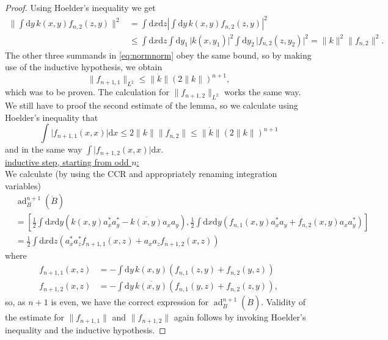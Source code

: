 \documentclass[11pt,a4paper]{scrartcl}
\newcommand{\ad}{\operatorname{ad}}	%
\newcommand{\di}{\textrm{d}}		%
\newcommand{\cc}[1]{\overline{#1}}	%
\newcommand{\norm}[1]{\lVert#1\rVert}	%
\newcommand{\bd}{\begin{displaymath}}			%
\newcommand{\ed}{\end{displaymath}}
\newcommand{\eqr}[1]{\eqref{eq:#1}}			%
\begin{document}
\begin{proof}
Using Hoelder's inequality we get
\begin{align*}
\norm{\int \di y\,k(x,y) f_{n,2}(z,y)}^2 &= \int \di x\di z \left\lvert \int \di y\,k(x,y) f_{n,2}(z,y) \right\rvert^2 \\
& \leq \int \di x \di z \int \di y_1\,\lvert k(x,y_1) \rvert^2 \int \di y_2\,\lvert f_{n,2}(z,y_2) \rvert^2 = \norm{k}^2 \norm{f_{n,2}}^2. 
\end{align*}
The other three summands in \eqr{normnorm} obey the same bound, so by making use of the inductive hypothesis, we obtain
\bd
\norm{f_{n+1,1}}_{L^2} \leq \norm{\dot k} (2\norm{k})^{n+1},
\ed
which was to be proven. The calculation for $\norm{f_{n+1,2}}_{L^2}$ works the same way. We still have to proof the second estimate of the lemma, so we calculate using Hoelder's inequality that
\bd
\int \lvert f_{n+1,1}(x,x) \rvert \di x \leq 2\norm{k} \norm{f_{n,2}} \leq \norm{\dot k} (2\norm{k})^{n+1}
\ed
and in the same way $\int \lvert f_{n+1,2}(x,x) \rvert \di x$.\\
\underline{inductive step, starting from odd $n$:}\\
We calculate (by using the CCR and appropriately renaming integration variables)
\begin{align*}
& \ad^{n+1}_B(\dot B)\\
& = \left[ \frac{1}{2}\int \di x \di y \left( k(x,y)a^\ast_x a^\ast_y - \cc{k(x,y)} a_x a_y \right) , \frac{1}{2}\int \di x\di y \left( f_{n,1}(x,y) a^\ast_x a_y + f_{n,2}(x,y) a_x a^\ast_y \right) \right] \\
& = \frac{1}{2} \int \di x\di z \left( a^\ast_x a^\ast_z f_{n+1,1}(x,z) + a_x a_z f_{n+1,2}(x,z) \right)
\end{align*}
where
\begin{equation}
\label{eq:odd}
\begin{split}
f_{n+1,1}(x,z) & = - \int \di y\, k(x,y)\left( f_{n,1}(z,y) + f_{n,2}(y,z) \right) \\
f_{n+1,2}(x,z) & = - \int \di y\, \cc{k(x,y)}\left( f_{n,1}(y,z) + f_{n,2}(z,y) \right),
\end{split}
\end{equation}
so, as $n+1$ is even, we have the correct expression for $\ad^{n+1}_B(\dot B)$. Validity of the estimate for $\norm{f_{n+1,1}}$ and $\norm{f_{n+1,2}}$ again follows by invoking Hoelder's inequality and the inductive hypothesis.
\end{proof}
\end{document}
